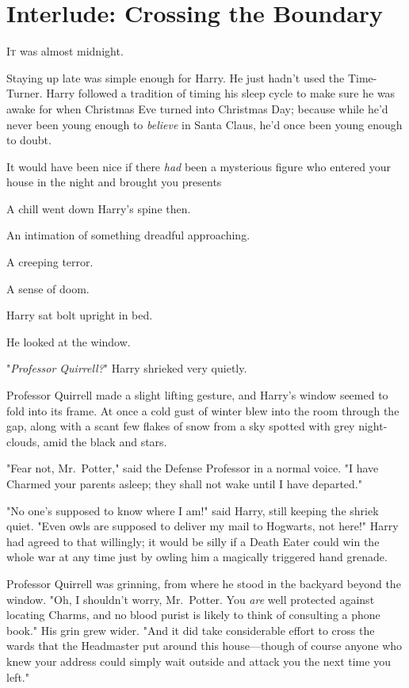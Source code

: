 \chapter{Interlude: Crossing the Boundary}

\lettrine{I}{t} was almost
midnight.

\quad\quad
Staying up late was simple enough for Harry. He just hadn't used the
Time-Turner. Harry followed a tradition of timing his sleep cycle to make sure
he was awake for when Christmas Eve turned into Christmas Day; because while
he'd never been young enough to \emph{believe} in Santa Claus, he'd once been
young enough to doubt.

It would have been nice if there \emph{had} been a mysterious figure who
entered your house in the night and brought you presents{\el}

A chill went down Harry's spine then.

An intimation of something dreadful approaching.

A creeping terror.

A sense of doom.

Harry sat bolt upright in bed.

He looked at the window.

"\emph{Professor Quirrell?}" Harry shrieked very quietly.

Professor Quirrell made a slight lifting gesture, and Harry's window seemed to
fold into its frame. At once a cold gust of winter blew into the room through
the gap, along with a scant few flakes of snow from a sky spotted with grey
night-clouds, amid the black and stars.

"Fear not, Mr.~Potter," said the Defense Professor in a normal voice. "I have
Charmed your parents asleep; they shall not wake until I have departed."

"No one's supposed to know where I am!" said Harry, still keeping the shriek
quiet. "Even owls are supposed to deliver my mail to Hogwarts, not here!" Harry
had agreed to that willingly; it would be silly if a Death Eater could win the
whole war at any time just by owling him a magically triggered hand grenade.

Professor Quirrell was grinning, from where he stood in the backyard beyond the
window. "Oh, I shouldn't worry, Mr.~Potter. You \emph{are} well protected
against locating Charms, and no blood purist is likely to think of consulting a
phone book." His grin grew wider. "And it did take considerable effort to cross
the wards that the Headmaster put around this house—though of course anyone
who knew your address could simply wait outside and attack you the next time
you left."

